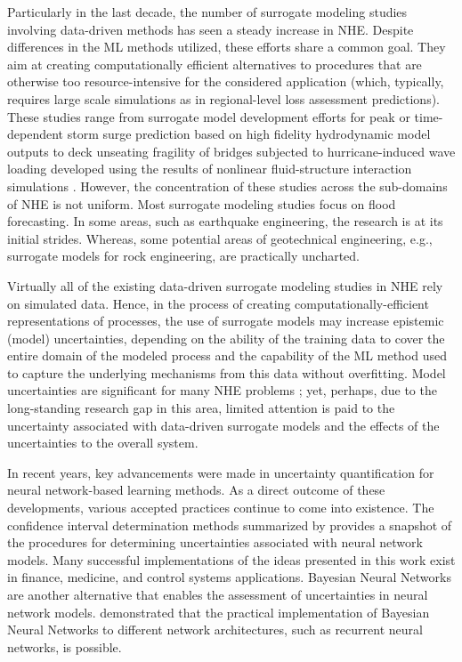 Particularly in the last decade, the number of surrogate modeling studies involving data-driven methods has seen a steady increase in NHE. Despite differences in the ML methods utilized, these efforts share a common goal. They aim at creating computationally efficient alternatives to procedures that are otherwise too resource-intensive for the considered application (which, typically, requires large scale simulations as in regional-level loss assessment predictions). These studies range from surrogate model development efforts for peak or time-dependent storm surge prediction based on high fidelity hydrodynamic model outputs \citep{jia2016surrogate} to deck unseating fragility of bridges subjected to hurricane-induced wave loading developed using the results of nonlinear fluid-structure interaction simulations \citep{ataei2015fragility}. However, the concentration of these studies across the sub-domains of NHE is not uniform. Most surrogate modeling studies focus on flood forecasting. In some areas, such as earthquake engineering, the research is at its initial strides. Whereas, some potential areas of geotechnical engineering, e.g., surrogate models for rock engineering, are practically uncharted.

Virtually all of the existing data-driven surrogate modeling studies in NHE rely on simulated data. Hence, in the process of creating computationally-efficient representations of processes, the use of surrogate models may increase epistemic (model) uncertainties, depending on the ability of the training data to cover the entire domain of the modeled process and the capability of the ML method used to capture the underlying mechanisms from this data without overfitting. Model uncertainties are significant for many NHE problems \citep{gokkaya2016quantifying}; yet, perhaps, due to the long-standing research gap in this area, limited attention is paid to the uncertainty associated with data-driven surrogate models and the effects of the uncertainties to the overall system.

In recent years, key advancements were made in uncertainty quantification for neural network-based learning methods. As a direct outcome of these developments, various accepted practices continue to come into existence. The confidence interval determination methods summarized by \cite{kabir2018neural} provides a snapshot of the procedures for determining uncertainties associated with neural network models. Many successful implementations of the ideas presented in this work exist in finance, medicine, and control systems applications. Bayesian Neural Networks \citep{blundell2015weight} are another alternative that enables the assessment of uncertainties in neural network models. \cite{mcdermott2019bayesian} demonstrated that the practical implementation of Bayesian Neural Networks to different network architectures, such as recurrent neural networks, is possible. 

